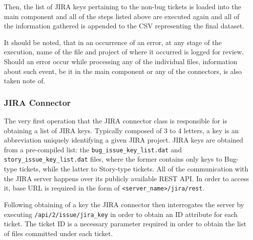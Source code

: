 Then, the list of JIRA keys pertaining to the non-bug tickets is loaded into the main component and all of the steps listed above are executed again and all of the information gathered is appended to the CSV representing the final dataset.

It should be noted, that in an occurrence of an error, at any stage of the execution, name of the file and project of where it occurred is logged for review. Should an error occur while processing any of the individual files, information about such event, be it in the main component or any of the connectors, is also taken note of.

\subsubsection{JIRA Connector}\label{sec:source-code:jira}
The very first operation that the JIRA connector class is responsible for is obtaining a list of JIRA keys. Typically composed of 3 to 4 letters, a key is an abbreviation uniquely identifying a given JIRA project. JIRA keys are obtained from a pre-compiled list: the \texttt{bug\_issue\_key\_list.dat} and \texttt{story\_issue\_key\_list.dat} files, where the former contains only keys to Bug-type tickets, while the latter to Story-type tickets. 
All of the communication with the JIRA server happens over its publicly available REST API. In order to access it, base URL is required in the form of \texttt{<server_name>/jira/rest}.

Following obtaining of a key the JIRA connector then interrogates the server by executing \texttt{/api/2/issue/{jira_key}} in order to obtain an ID attribute for each ticket. The ticket ID is a necessary parameter required in order to obtain the list of files committed under each ticket.

